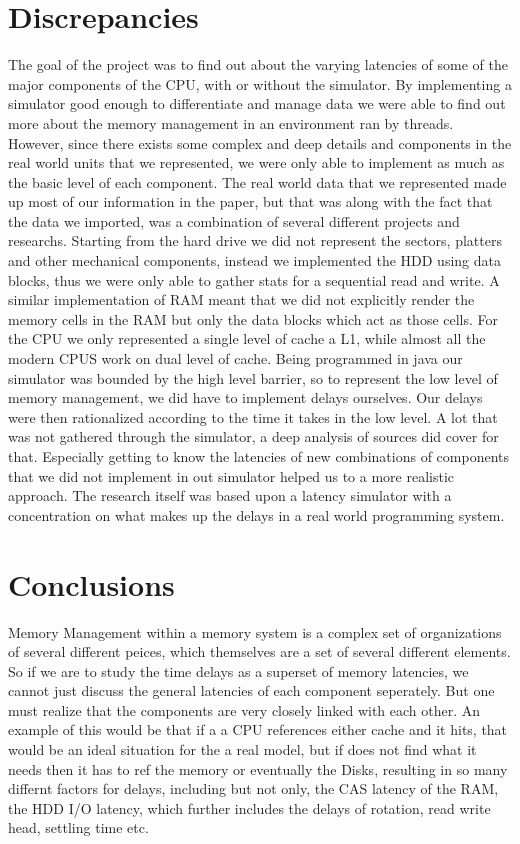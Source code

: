 \documentclass[12pt]{article}
\newcommand{\singlespace}{
  \protect\renewcommand\baselinestretch{1.0}
  \protect\normalsize
}
\begin{document}
\section{Discrepancies}
\label{sec:disc}

The goal of the project was to find out about the varying latencies of some of the major components of the CPU, with
or without the simulator. By implementing a simulator good enough to differentiate and manage data we were able to
find out more about the memory management in an environment ran by threads. However, since there exists some complex
and deep details and components in the real world units that we represented, we were only able to implement as much
as the basic level of each component.
The real world data that we represented made up most of our information in the paper, but that was along with the
fact that the data we imported, was a combination of several different projects and researchs.
Starting from the hard drive we did not represent the sectors, platters and other mechanical components, instead
we implemented the HDD using data blocks, thus we were only able to gather stats for a sequential read and write.
A similar implementation of RAM meant that we did not explicitly render the memory cells in the RAM but only the
data blocks which act as those cells.
For the CPU we only represented a single level of cache a L1, while almost all the modern CPUS work on dual level
of cache.
Being programmed in java our simulator was bounded by the high level barrier, so to represent the low
level of memory management, we did have to implement delays ourselves. Our delays were then rationalized according
to the time it takes in the low level. 
A lot that was not gathered through the simulator, a deep analysis of sources did cover for that. Especially getting
to know the latencies of new combinations of components that we did not implement in out simulator helped us to a
more realistic approach. The research itself was based upon a latency simulator with a concentration on what makes
up the delays in a real world programming system. 


\section{Conclusions} 

\label{sec:conclusions}

Memory Management within a memory system is a complex set of organizations of several different peices, which
themselves are a set of several different elements. So if we are to study the time delays as a superset of
memory latencies, we cannot just discuss the general latencies of each component seperately. But one must
realize that the components are very closely linked with each other. An example of this would be that if a
a CPU references either  cache and it hits, that would be an ideal situation for the a real model, but if does
not find what it needs then it has to ref the memory or eventually the Disks, resulting in so many differnt
factors for delays, including but not only, the CAS latency of the RAM, the HDD I/O latency, which further
includes the delays of rotation, read write head, settling time etc.


\singlespace



\end{document}
